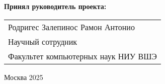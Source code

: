 \begin{titlepage}
    \vspace{1em}
    {\bf Принял руководитель проекта: \vspace{2mm}}
    
    {
    \begin{tabular}{l}
    Родригес Залепинос Рамон Антонио\\
    Научный сотрудник\\
    Факультет компьютерных наук НИУ ВШЭ 
    \end{tabular}}
    
    
    
    
    
    \vspace{\fill}
    
    \begin{center}
    Москва 2025
    \end{center}
    
    \end{titlepage}